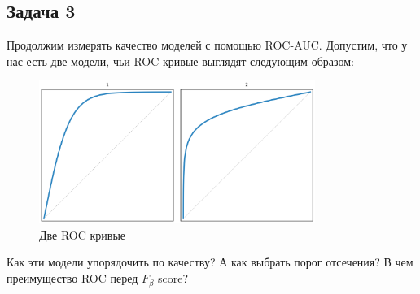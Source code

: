 \subsection*{Задача 3}
Продолжим измерять качество моделей с помощью ROC-AUC. Допустим, что у нас есть две модели, чьи ROC кривые выглядят следующим образом:
\begin{figure}[h]
    \centering
    \includegraphics[width=0.8\textwidth]{roc_curves_comparison_2.png}
    \caption{Две ROC кривые}
\end{figure}
Как эти модели упорядочить по качеству? А как выбрать порог отсечения? В чем преимущество ROC перед $F_{\beta}$ score?

